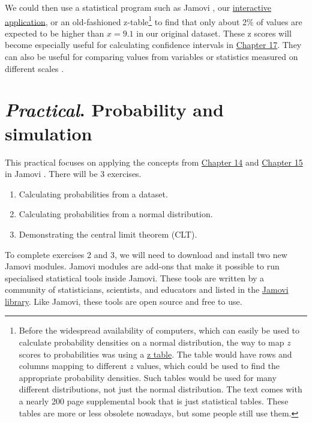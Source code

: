 \documentclass[
]{scrbook}
\providecommand{\tightlist}{%
  \setlength{\itemsep}{0pt}\setlength{\parskip}{0pt}}
\begin{document}
We could then use a statistical program such as Jamovi \citep{Jamovi2022}, our \href{https://bradduthie.shinyapps.io/zandp/}{interactive application}, or an old-fashioned z-table\footnote{Before the widespread availability of computers, which can easily be used to calculate probability densities on a normal distribution, the way to map \(z\) scores to probabilities was using a \href{https://www.z-table.com/}{z table}. The table would have rows and columns mapping to different \(z\) values, which could be used to find the appropriate probability densities. Such tables would be used for many different distributions, not just the normal distribution. The text \citet{Sokal1995} comes with a nearly 200 page supplemental book that is just statistical tables. These tables are more or less obsolete nowadays, but some people still use them.} to find that only about 2\% of values are expected to be higher than \(x = 9.1\) in our original dataset.
These z scores will become especially useful for calculating confidence intervals in \protect\hyperlink{Chapter_17}{Chapter 17}.
They can also be useful for comparing values from variables or statistics measured on different scales \citep{Sokal1995, Cheadle2003, Adams2016}.

\hypertarget{Chapter_16}{%
\chapter{\texorpdfstring{\emph{Practical}. Probability and simulation}{Practical. Probability and simulation}}\label{Chapter_16}}

This practical focuses on applying the concepts from \protect\hyperlink{Chapter_14}{Chapter 14} and \protect\hyperlink{Chapter_15}{Chapter 15} in Jamovi \citep{Jamovi2022}.
There will be 3 exercises.

\begin{enumerate}
\def\labelenumi{\arabic{enumi}.}
\tightlist
\item
  Calculating probabilities from a dataset.
\item
  Calculating probabilities from a normal distribution.
\item
  Demonstrating the central limit theorem (CLT).
\end{enumerate}

To complete exercises 2 and 3, we will need to download and install two new Jamovi modules.
Jamovi modules are add-ons that make it possible to run specialised statistical tools inside Jamovi.
These tools are written by a community of statisticians, scientists, and educators and listed in the \href{https://www.jamovi.org/library.html}{Jamovi library}.
Like Jamovi, these tools are open source and free to use.
\end{document}

